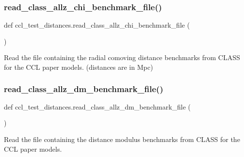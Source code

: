 \subsubsection{\texorpdfstring{read\+\_\+class\+\_\+allz\+\_\+chi\+\_\+benchmark\+\_\+file()}{read\_class\_allz\_chi\_benchmark\_file()}}
{\footnotesize\ttfamily def ccl\+\_\+test\+\_\+distances.\+read\+\_\+class\+\_\+allz\+\_\+chi\+\_\+benchmark\+\_\+file (\begin{DoxyParamCaption}{ }\end{DoxyParamCaption})}

\begin{DoxyVerb}Read the file containing the radial comoving distance benchmarks from
CLASS for the CCL paper models. (distances are in Mpc)
\end{DoxyVerb}
 \mbox{\label{namespaceccl__test__distances_a15d6c0001cdf1c1387ba93eaa5303ffe}} 
\subsubsection{\texorpdfstring{read\+\_\+class\+\_\+allz\+\_\+dm\+\_\+benchmark\+\_\+file()}{read\_class\_allz\_dm\_benchmark\_file()}}
{\footnotesize\ttfamily def ccl\+\_\+test\+\_\+distances.\+read\+\_\+class\+\_\+allz\+\_\+dm\+\_\+benchmark\+\_\+file (\begin{DoxyParamCaption}{ }\end{DoxyParamCaption})}

\begin{DoxyVerb}Read the file containing the distance modulus benchmarks from
CLASS for the CCL paper models.
\end{DoxyVerb}
 \mbox{\label{namespaceccl__test__distances_a715a30aba8dcfe6b8712ce86c815171e}} 
